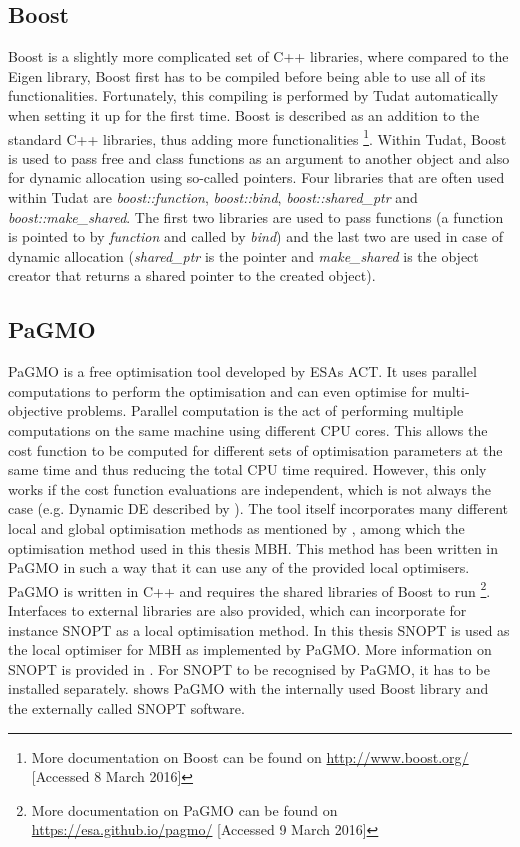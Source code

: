 \subsection{Boost}
\label{subsec:boost}
Boost is a slightly more complicated set of C++ libraries, where compared to the Eigen library, Boost first has to be compiled before being able to use all of its functionalities. Fortunately, this compiling is performed by \ac{Tudat} automatically when setting it up for the first time. Boost is described as an addition to the standard C++ libraries, thus adding more functionalities \citep{dirkx2016tudat} \footnote{More documentation on Boost can be found on \url{http://www.boost.org/} [Accessed 8 March 2016]}. Within \ac{Tudat}, Boost is used to pass free and class functions as an argument to another object and also for dynamic allocation using so-called pointers. Four libraries that are often used within \ac{Tudat} are \textit{boost::function}, \textit{boost::bind}, \textit{boost::shared\_ptr} and \textit{boost::make\_shared}. The first two libraries are used to pass functions (a function is pointed to by \textit{function} and called by \textit{bind}) and the last two are used in case of dynamic allocation (\textit{shared\_ptr} is the pointer and \textit{make\_shared} is the object creator that returns a shared pointer to the created object). 

\subsection{\ac{PaGMO}}
\label{subsec:pagmo}
\ac{PaGMO} is a free optimisation tool developed by \ac{ESA}s \ac{ACT}. It uses parallel computations to perform the optimisation and can even optimise for multi-objective problems. Parallel computation is the act of performing multiple computations on the same machine using different CPU cores. This allows the cost function to be computed for different sets of optimisation parameters at the same time and thus reducing the total CPU time required. However, this only works if the cost function evaluations are independent, which is not always the case (e.g. Dynamic \ac{DE} described by \cite{qing2009differential}). The tool itself incorporates many different local and global optimisation methods as mentioned by \cite{izzo2012pygmo}, among which the optimisation method used in this thesis \ac{MBH}. This method has been written in \ac{PaGMO} in such a way that it can use any of the provided local optimisers. \ac{PaGMO} is written in C++ and requires the shared libraries of Boost to run \footnote{More documentation on \ac{PaGMO} can be found on \url{https://esa.github.io/pagmo/} [Accessed 9 March 2016]}. Interfaces to external libraries are also provided, which can incorporate for instance \ac{SNOPT} as a local optimisation method. In this thesis \ac{SNOPT} is used as the local optimiser for \ac{MBH} as implemented by \ac{PaGMO}. More information on \ac{SNOPT} is provided in . For \ac{SNOPT} to be recognised by \ac{PaGMO}, it has to be installed separately.  shows \ac{PaGMO} with the internally used Boost library and the externally called \ac{SNOPT} software.

